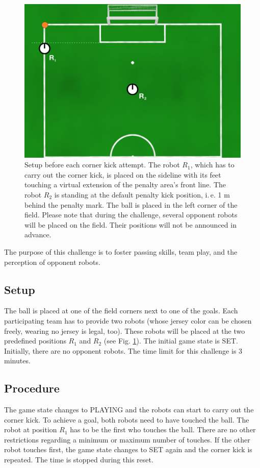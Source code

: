 \documentclass[12pt]{article}
\newcommand{\ie}{\mbox{i.\,e.}\xspace}
\begin{document}
\begin{figure}[t]
\centerline{\includegraphics[width=0.8\columnwidth]{figures/corner-kicks-challenge}}
\caption{Setup before each corner kick attempt. The robot $R_1$, which has to carry out the corner kick, is placed on the sideline with its feet touching a virtual extension of the penalty area's front line. The robot $R_2$ is standing at the default penalty kick position, \ie 1 m behind the penalty mark. The ball is placed in the left corner of the field. Please note that during the challenge, several opponent robots will be placed on the field. Their positions will not be announced in advance.}
\label{fig:corner_kicks_challenge}
\end{figure}


The purpose of this challenge is to foster passing skills, team play, and the perception of opponent robots.

\subsection{Setup}
The ball is placed at one of the field corners next to one of the goals. Each participating team has to provide two robots (whose jersey color can be chosen freely, wearing no jersey is legal, too). These robots will be placed at the two predefined positions $R_1$ and $R_2$ (see Fig. \ref{fig:corner_kicks_challenge}). The initial game state is SET. Initially, there are no opponent robots. The time limit for this challenge is 3 minutes.

\subsection{Procedure}
The game state changes to PLAYING and the robots can start to carry out the corner kick. To achieve a goal, both robots need to have touched the ball. The robot at position $R_1$ has to be the first who touches the ball. There are no other restrictions regarding a minimum or maximum number of touches. If the other robot touches first, the game state changes to SET again and the corner kick is repeated. The time is stopped during this reset.
\end{document}
